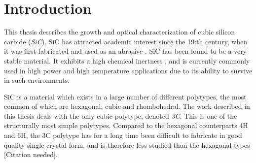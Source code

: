 
\chapter{Introduction}






This thesis describes the growth and optical characterization of cubic silicon carbide (\emph{SiC}). SiC has attracted academic interest since the 19:th century, when it was first fabricated and used as an abrasive \cite{Acheson1893}. SiC has been found to be a very stable material. It exhibits a high chemical inertness \cite{Hume1941}, and is currently commonly used in high power and high temperature applications due to its ability to survive in such environments. 

SiC is a material which exists in a large number of different polytypes, the most common of which are hexagonal, cubic and rhombohedral. The work described in this thesis deals with the only cubic polytype, denoted \emph{3C}. This is one of the structurally most simple polytypes. Compared to the hexagonal counterparts 4H and 6H, the 3C polytype has for a long time been difficult to fabricate in good quality single crystal form, and is therefore less studied than the hexagonal types [Citation needed]. 